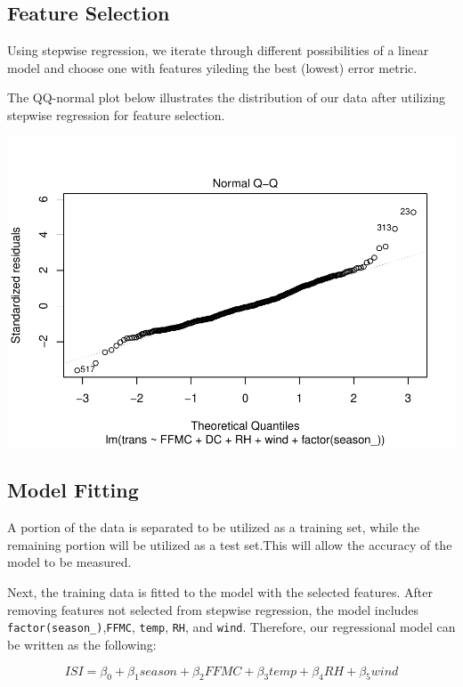 \documentclass[conference,final,]{IEEEtran}
\makeatletter
\def\maxwidth{\ifdim\Gin@nat@width>\linewidth\linewidth
\else\Gin@nat@width\fi}
\let\Oldincludegraphics\includegraphics
\renewcommand{\includegraphics}[1]{\Oldincludegraphics[width=\maxwidth]{#1}}
\makeatother
\begin{document}
\hypertarget{feature-selection}{%
\subsection{Feature Selection}\label{feature-selection}}

Using stepwise regression, we iterate through different possibilities of
a linear model and choose one with features yileding the best (lowest)
error metric.

The QQ-normal plot below illustrates the distribution of our data after
utilizing stepwise regression for feature selection.

\includegraphics{forest_fires_files/figure-latex/unnamed-chunk-5-1.pdf}

\hypertarget{model-fitting}{%
\subsection{Model Fitting}\label{model-fitting}}

A portion of the data is separated to be utilized as a training set,
while the remaining portion will be utilized as a test set.This will
allow the accuracy of the model to be measured.

Next, the training data is fitted to the model with the selected
features. After removing features not selected from stepwise regression,
the model includes \texttt{factor(season\_)},\texttt{FFMC},
\texttt{temp}, \texttt{RH}, and \texttt{wind}. Therefore, our
regressional model can be written as the following:

\[ISI = \beta_{0} + \beta_{1}season + \beta_{2}FFMC + \beta_{3}temp + \beta_{4}RH + \beta_{5}wind\]
\end{document}
